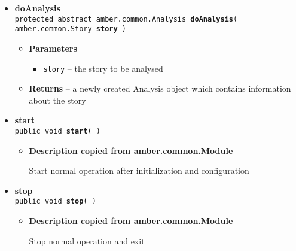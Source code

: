 {{{\begin{itemize}
{\begin{itemize}
{Message reception handler. It is called on the object implementing this interface which was set in AirBrush.
}
\item{
{\bf Parameters}
  \begin{itemize}
   \item{
{\tt msg} -- }
  \end{itemize}
}%
\item{{\bf Returns} -- 
true if the message was handled, false if it wasn't 
}%
\item{{\bf See also}
  \begin{itemize}
\item{ {\tt amber.common.AirBrush.setCallbackObject(AirBrushCallable)} {\small 
{}}%
}
  \end{itemize}
}%
\end{itemize}
}%
 \item{ 
{\bf doAnalysis}\\
{\tt protected abstract amber.common.Analysis\ {\bf doAnalysis}( {\tt amber.common.Story} {\bf story} )
\label{amber.sieve.KeywordSpotter.doAnalysis(amber.common.Story)}}%
\begin{itemize}
\item{
{\bf Parameters}
  \begin{itemize}
   \item{
{\tt story} -- the story to be analysed}
  \end{itemize}
}%
\item{{\bf Returns} -- 
a newly created Analysis object which contains information about the story 
}%
\end{itemize}
}%
 \item{ 
{\bf start}\\
{\tt public void\ {\bf start}(  )
\label{amber.sieve.KeywordSpotter.start()}}%
\begin{itemize}
\item{
{\bf Description copied from amber.common.Module{\small {}} }

Start normal operation after initialization and configuration
}
\end{itemize}
}%
 \item{ 
{\bf stop}\\
{\tt public void\ {\bf stop}(  )
\label{amber.sieve.KeywordSpotter.stop()}}%
\begin{itemize}
\item{
{\bf Description copied from amber.common.Module{\small {}} }

Stop normal operation and exit
}
\end{itemize}
}%
\end{itemize}
}
}
}
